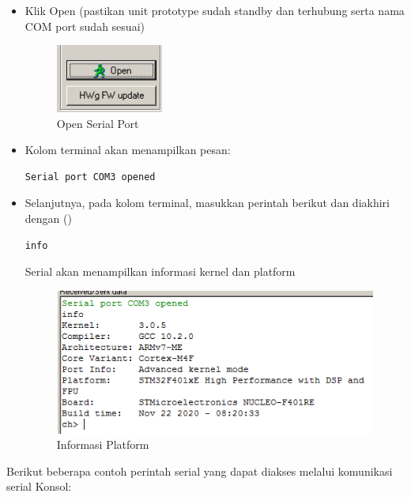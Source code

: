 \documentclass{article}
\begin{document}
\begin{enumerate}
\begin{itemize}
			\item Klik Open (pastikan unit prototype sudah standby dan terhubung
			serta nama COM port sudah sesuai)

			\begin{figure}[H]
				\centering
				\includegraphics[width=100pt]{images/software/hercules_open}
				\caption{Open Serial Port}
			\end{figure}

			\item Kolom terminal akan menampilkan pesan:
			\begin{verbatim}
Serial port COM3 opened
			\end{verbatim}

			\item Selanjutnya, pada kolom terminal,
			masukkan perintah berikut dan diakhiri dengan (\keys{\return})
			\begin{verbatim}
info
			\end{verbatim}
			Serial akan menampilkan informasi kernel dan platform
			\begin{figure}[H]
				\centering
				\includegraphics[width=300pt]{images/software/hercules_text}
				\caption{Informasi Platform}
			\end{figure}
		\end{itemize}

	\end{enumerate}

	Berikut beberapa contoh perintah serial yang dapat diakses melalui komunikasi serial Konsol:
\end{document}
